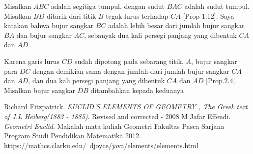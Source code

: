 \documentclass[a4paper]{book}
\begin{document}
Misalkan $ABC$ adalah segitiga tumpul, dengan sudut $BAC$ adalah sudut tumpul.
Misalkan $BD$ ditarik dari titik $B$ tegak lurus terhadap $CA$ [Prop 1.12]. Saya
katakan bahwa bujur sangkar $BC$ adalah lebih besar dari jumlah bujur sangkar $BA$
dan bujur sangkar $AC$, sebanyak dua kali persegi panjang yang dibentuk $CA$ dan $AD$.

Karena garis lurus $CD$ sudah dipotong pada sebarang titik, $A$, bujur sangkar para $DC$
dengan demikian sama dengan jumlah dari jumlah bujur sangkar $CA$ dan $AD$, dan dua kali
persegi panjang yang dibentuk $CA$ dan $AD$ [Prop.2.4]. Misalkan bujur  sangkar $DB$
ditambahkan kepada keduanya

\begin{thebibliography}{9}
Richard Fitzpatrick.
\textit{EUCLID’S ELEMENTS OF GEOMETRY , The Greek text of J.L Heiberg(1883 - 1885)}.
Revised and corrected - 2008 
M Jafar Effendi.
\textit{Geometri Euclid}.
Makalah mata kuliah Geometri Fakultas Pasca Sarjana Program Studi Pendidikan Matematika 2012.
https://mathcs.clarku.edu/~djoyce/java/elements/elements.html 
\end{thebibliography}
\end{document}
